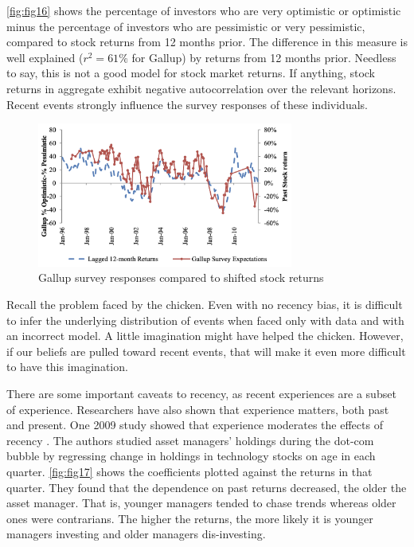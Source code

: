 \autoref{fig:fig16} \citep{greenwood2014expectations} shows the percentage of investors who are very optimistic or optimistic minus the percentage of investors who are pessimistic or very pessimistic, compared to stock returns from 12 months prior. The difference in this measure is well explained ($r^2 = 61 \%$ for Gallup) by returns from 12 months prior. Needless to say, this is not a good model for stock market returns. If anything, stock returns in aggregate exhibit negative autocorrelation over the relevant horizons. Recent events strongly influence the survey responses of these individuals. 

\begin{figure}[h]
    \centering
    \includegraphics[width=0.75\textwidth]{fig16.png}
    \caption{Gallup survey responses compared to shifted stock returns \citep{greenwood2014expectations}}
    \label{fig:fig16}
\end{figure}

Recall the problem faced by the chicken. Even with no recency bias, it is difficult to infer the underlying distribution of events when faced only with data and with an incorrect model. A little imagination might have helped the chicken. However, if our beliefs are pulled toward recent events, that will make it even more difficult to have this imagination.

There are some important caveats to recency, as recent experiences are a subset of experience. Researchers have also shown that experience matters, both past and present. One 2009 study showed that experience moderates the effects of recency \citep{greenwood2014expectations}. The authors studied asset managers' holdings during the dot-com bubble by regressing change in holdings in technology stocks on age in each quarter. \autoref{fig:fig17} \citep{greenwood2009inexperienced} shows the coefficients plotted against the returns in that quarter. They found that the dependence on past returns decreased, the older the asset manager. That is, younger managers tended to chase trends whereas older ones were contrarians. The higher the returns, the more likely it is younger managers investing and older managers dis-investing.

